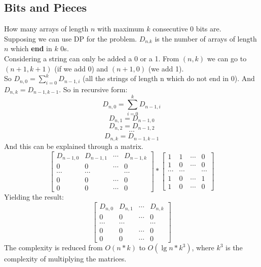 \documentclass{IEEEtran}
\begin{document}
        \subsection{Bits and Pieces}
            How many arrays of length $n$ with maximum $k$ consecutive 0 bits are.\\
            Supposing we can use DP for the problem. $D_{n.k}$ is the number of arrays of length $n$ which \textbf{end} in $k$ 0s.\\
            Considering a string can only be added a 0 or a 1. From $(n,k)$ we can go to $(n+1,k+1)$ (if we add 0) and $(n+1,0)$ (we add 1).\\
            So $D_{n,0} = \sum_{i=0}^k D_{n-1,i}$ (all the strings of length n which do not end in 0). And $D_{n,k}=D_{n-1,k-1}.$ So in recursive form:
            $$D_{n,0} = \sum_{i=0}^k D_{n-1,i}$$
            $$D_{n,1} = D_{n-1,0}$$
            $$D_{n,2} = D_{n-1,2}$$
            $$\cdots$$
            $$D_{n,k} = D_{n-1,k-1}$$
            And this can be explained through a matrix.
            $$
            \begin{bmatrix}
                D_{n-1,0}&D_{n-1,1}&\cdots&D_{n-1,k}\\
                0&0&\cdots&0\\
                \cdots&\cdots&&\cdots\\
                0&0&\cdots&0\\
                0&0&\cdots&0
            \end{bmatrix}*
            \begin{bmatrix}
                1&1&\cdots&0\\
                1&0&\cdots&0\\
                \cdots&\cdots&&\cdots\\
                1&0&\cdots&1\\
                1&0&\cdots&0
            \end{bmatrix}
            $$
            Yielding the result:
            $$
            \begin{bmatrix}
                D_{n,0}&D_{n,1}&\cdots&D_{n,k}\\
                0&0&\cdots&0\\
                \cdots&\cdots&&\cdots\\
                0&0&\cdots&0\\
                0&0&\cdots&0
            \end{bmatrix}
            $$
            The complexity is reduced from $O(n*k)$ to $O(\lg{n}*k^3)$, where $k^3$ is the complexity of multiplying the matrices. 
\end{document}

